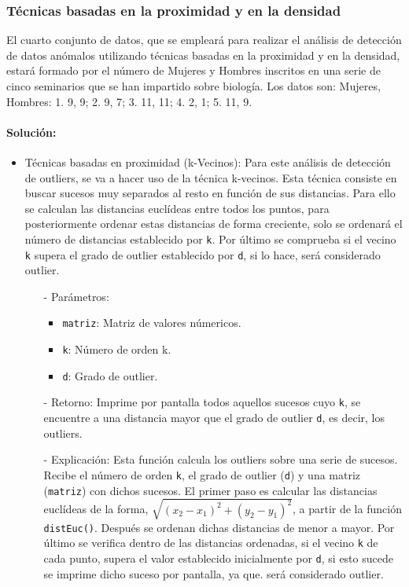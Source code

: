 \documentclass[a4paper, 12pt]{article}
\begin{document}
		\subsubsection{Técnicas basadas en la proximidad y en la densidad}
		El cuarto conjunto de datos, que se empleará para realizar el análisis de detección de datos anómalos utilizando técnicas basadas en la proximidad y en la densidad, estará formado por el número de Mujeres y Hombres inscritos en una serie de cinco seminarios que se han impartido sobre biología. Los datos son: {Mujeres, Hombres}: 1. {9, 9}; 2. {9, 7}; 3. {11, 11}; 4. {2, 1}; 5. {11, 9}.
		
		\paragraph{Solución:}
		\begin{itemize}
			\item Técnicas basadas en proximidad (k-Vecinos): Para este análisis de detección de outliers, se va a hacer uso de la técnica k-vecinos. Esta técnica consiste en buscar sucesos muy separados al resto en función de sus distancias. Para ello se calculan las distancias euclídeas entre todos los puntos, para posteriormente ordenar estas distancias de forma creciente, solo se ordenará el número de distancias establecido por \texttt{k}. Por último se comprueba si el vecino \texttt{k} supera el grado de outlier establecido por \texttt{d}, si lo hace, será considerado outlier.
			\begin{itemize}
				\item[-] Parámetros:
				\begin{itemize}
					\item \texttt{matriz}: Matriz de valores númericos.
					\item \texttt{k}: Número de orden k.
					\item \texttt{d}: Grado de outlier.
				\end{itemize}
				
				\item[-] Retorno: Imprime por pantalla todos aquellos sucesos cuyo \texttt{k}, se encuentre a una distancia mayor que el grado de outlier \texttt{d}, es decir, los outliers.
				
				\item[-] Explicación: Esta función calcula los outliers sobre una serie de sucesos. Recibe el número de orden \texttt{k}, el grado de outlier (\texttt{d}) y una matriz (\texttt{matriz}) con dichos sucesos. El primer paso es calcular las distancias euclídeas de la forma, \texttt{$\sqrt{(x_2 - x_1)^2 + (y_2 - y_1)^2}$}, a partir de la función \texttt{distEuc()}. Después se ordenan dichas distancias de menor a mayor. Por último se verifica dentro de las distancias ordenadas, si el vecino \texttt{k} de cada punto, supera el valor establecido inicialmente por \texttt{d}, si esto sucede se imprime dicho suceso por pantalla, ya que. será considerado outlier.


\end{itemize}
\end{itemize}
\end{document}
